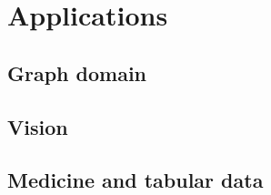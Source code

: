 \chapter{Applications}

\section{Graph domain}

\section{Vision}

\section{Medicine and tabular data}

